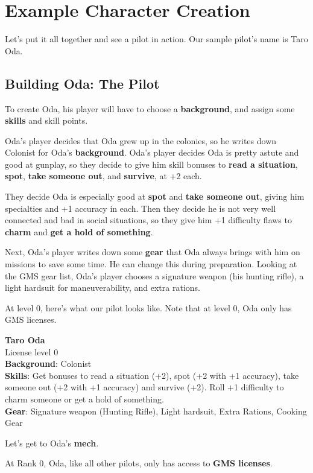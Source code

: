 \section{Example Character Creation}


Let's put it all together and see a pilot in action. Our sample pilot's name is Taro Oda.

\subsection{Building Oda: The Pilot}

To create Oda, his player will have to choose a \textbf{background}, and assign some \textbf{skills} and skill points.


Oda's player decides that Oda grew up in the colonies, so he writes down Colonist for Oda's \textbf{background}. Oda's player decides Oda is pretty astute and good at gunplay, so they decide to give him skill bonuses to \textbf{read a situation}, \textbf{spot}, \textbf{take someone out}, and \textbf{survive}, at +2 each.

They decide Oda is especially good at \textbf{spot} and \textbf{take someone out}, giving him specialties and +1 accuracy in each. Then they decide he is not very well connected and bad in social situations, so they give him +1 difficulty flaws to \textbf{charm} and \textbf{get a hold of something}.

Next, Oda's player writes down some \textbf{gear} that Oda always brings with him on missions to save some time. He can change this during preparation. Looking at the GMS gear list, Oda's player chooses a signature weapon (his hunting rifle), a light hardsuit for maneuverability, and extra rations.

At level 0, here's what our pilot looks like. Note that at level 0, Oda only has GMS licenses.

\textbf{Taro Oda}\\
License level 0\\
\textbf{Background}: Colonist\\
\textbf{Skills}: Get bonuses to read a situation (+2), spot (+2 with +1 accuracy), take someone out (+2 with +1 accuracy) and survive (+2). Roll +1 difficulty to charm someone or get a hold of something.\\
\textbf{Gear}: Signature weapon (Hunting Rifle), Light hardsuit, Extra Rations, Cooking Gear

Let's get to Oda's \textbf{mech}.

At Rank 0, Oda, like all other pilots, only has access to \textbf{GMS licenses}.

